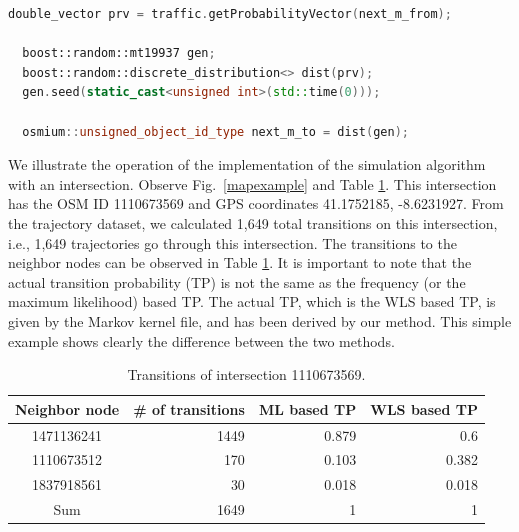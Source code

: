 \documentclass[b5paper,12pt]{report}
\theoremstyle{definition}
\begin{document}
\begin{lstlisting}[language=C++,caption=Operation of the car entity in a Markov traffic simulation., label=car-markov, escapechar={|}]
  double_vector prv = traffic.getProbabilityVector(next_m_from);

  boost::random::mt19937 gen;
  boost::random::discrete_distribution<> dist(prv);
  gen.seed(static_cast<unsigned int>(std::time(0)));

  osmium::unsigned_object_id_type next_m_to = dist(gen);
\end{lstlisting}

We illustrate the operation of the implementation of the simulation algorithm with an intersection. Observe Fig.~\ref{mapexample} and Table \ref{transitions_example}. This intersection has the OSM ID 1110673569 and GPS coordinates 41.1752185, -8.6231927. From the trajectory dataset, we calculated 1,649 total transitions on this intersection, i.e., 1,649 trajectories go through this intersection. The transitions to the neighbor nodes can be observed in Table \ref{transitions_example}. It is important to note that the actual transition probability (TP) is not the same as the frequency (or the maximum likelihood) based TP. The actual TP, which is the WLS based TP, is given by the Markov kernel file, and has been derived by our method. This simple example shows clearly the difference between the two methods.

\begin{table}[!h]
\centering
\caption{Transitions of intersection 1110673569.}
\label{transitions_example}
\vspace{.5cm} 
\begin{tabular}{c |r r r}
Neighbor node    & \# of transitions & ML based TP & WLS based TP  \\ \hline
1471136241          & 1449  & 0.879 & 0.6    \\ 
1110673512          & 170  & 0.103   & 0.382   \\ 
1837918561          & 30  & 0.018   & 0.018  \\ 
\hline
Sum & 1649 & 1 & 1
\end{tabular}
\end{table}
\end{document}
